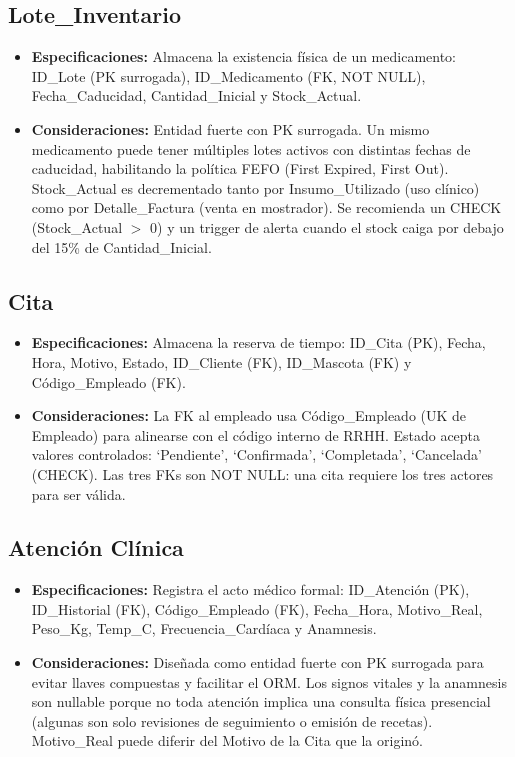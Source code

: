 \subsection{Lote\_Inventario}

\begin{itemize}
	\item \textbf{Especificaciones:} Almacena la existencia física de un medicamento: ID\_Lote (PK surrogada), ID\_Medicamento (FK, NOT NULL), Fecha\_Caducidad, Cantidad\_Inicial y Stock\_Actual.
	\item \textbf{Consideraciones:} Entidad fuerte con PK surrogada. Un mismo medicamento puede tener múltiples lotes activos con distintas fechas de caducidad, habilitando la política FEFO (First Expired, First Out). Stock\_Actual es decrementado tanto por Insumo\_Utilizado (uso clínico) como por Detalle\_Factura (venta en mostrador). Se recomienda un CHECK (Stock\_Actual $>$ 0) y un trigger de alerta cuando el stock caiga por debajo del 15\% de Cantidad\_Inicial.
\end{itemize}

\subsection{Cita}

\begin{itemize}
	\item \textbf{Especificaciones:} Almacena la reserva de tiempo: ID\_Cita (PK), Fecha, Hora, Motivo, Estado, ID\_Cliente (FK), ID\_Mascota (FK) y Código\_Empleado (FK).
	\item \textbf{Consideraciones:} La FK al empleado usa Código\_Empleado (UK de Empleado) para alinearse con el código interno de RRHH. Estado acepta valores controlados: `Pendiente', `Confirmada', `Completada', `Cancelada' (CHECK). Las tres FKs son NOT NULL: una cita requiere los tres actores para ser válida.
\end{itemize}

\subsection{Atención Clínica}

\begin{itemize}
	\item \textbf{Especificaciones:} Registra el acto médico formal: ID\_Atención (PK), ID\_Historial (FK), Código\_Empleado (FK), Fecha\_Hora, Motivo\_Real, Peso\_Kg, Temp\_C, Frecuencia\_Cardíaca y Anamnesis.
	\item \textbf{Consideraciones:} Diseñada como entidad fuerte con PK surrogada para evitar llaves compuestas y facilitar el ORM. Los signos vitales y la anamnesis son nullable porque no toda atención implica una consulta física presencial (algunas son solo revisiones de seguimiento o emisión de recetas). Motivo\_Real puede diferir del Motivo de la Cita que la originó.
\end{itemize}

